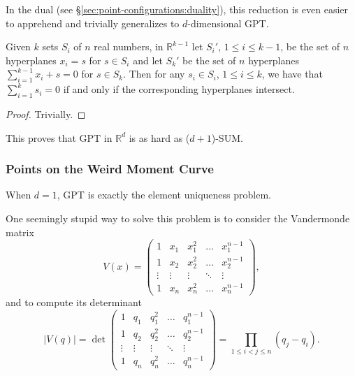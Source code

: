 In the dual (see \S\ref{sec:point-configurations:duality}),
this reduction is even easier to apprehend and trivially
generalizes to \(d\)-dimensional GPT.
%
\begin{observation}
Given \(k\) sets \(S_i\) of \(n\) real numbers,
in \(\mathbb{R}^{k-1}\)
let
\(S_i'\), \(1 \leq i \leq k-1\),
be the set of \(n\) hyperplanes \(x_i = s\) for \(s \in S_i\) and let
\(S_k'\) be the set of \(n\) hyperplanes \(\sum_{i=1}^{k-1} x_i + s = 0\) for
\(s \in S_k\).
Then for any \(s_i \in S_i\), \(1 \leq i \leq k\),
we have that
\(\sum_{i=1}^{k} s_i = 0\)
if and only if
the corresponding hyperplanes intersect.
\end{observation}
%
\begin{proof}
    Trivially.
\end{proof}
%
This proves that GPT in \(\mathbb{R}^d\) is as hard as (\(d+1\))-SUM.

\subsubsection{Points on the Weird Moment Curve}

When \(d=1\), GPT is exactly the element uniqueness problem.
%


One seemingly stupid way to solve this problem is to
consider the Vandermonde matrix
%
\begin{displaymath}
V(x) = \begin{pmatrix}
    1       & x_1     & x_1^2     & \dots  & x_1^{n-1}     \\
    1       & x_2     & x_2^2     & \dots  & x_2^{n-1}     \\
    \vdots  & \vdots  & \vdots    & \ddots & \vdots        \\
    1       & x_n & x_n^2 & \dots  & x_n^{n-1}
\end{pmatrix},
\end{displaymath}
%
and to compute its determinant
%
\begin{displaymath}
|V(q)| = \det\begin{pmatrix}
    1       & q_1     & q_1^2     & \dots  & q_1^{n-1}     \\
    1       & q_2     & q_2^2     & \dots  & q_2^{n-1}     \\
    \vdots  & \vdots  & \vdots    & \ddots & \vdots        \\
    1       & q_n & q_n^2 & \dots  & q_n^{n-1}
\end{pmatrix}
=
\prod_{1 \leq i < j \leq n} (q_j - q_i).
\end{displaymath}

